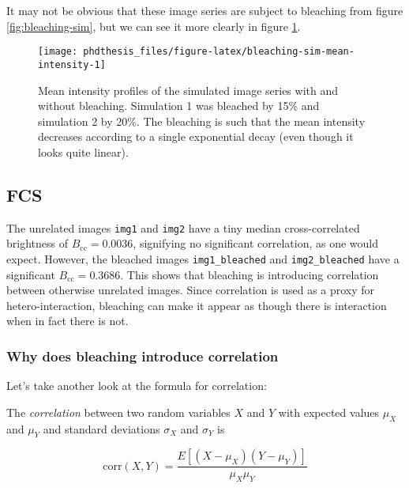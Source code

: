 \documentclass[12pt,]{book}
\theoremstyle{definition}
\theoremstyle{definition}
\theoremstyle{definition}
\theoremstyle{remark}
\let\BeginKnitrBlock\begin \let\EndKnitrBlock\end
\begin{document}
It may not be obvious that these image series are subject to bleaching
from figure \ref{fig:bleaching-sim}, but we can see it more clearly in
figure \ref{fig:bleaching-sim-mean-intensity}.







\begin{figure}

\texttt{[image: phdthesis\_files/figure-latex/bleaching-sim-mean-intensity-1]} \hfill{}

\caption{Mean intensity profiles of
the simulated image series with and without bleaching. Simulation 1 was
bleached by 15\% and simulation 2 by 20\%. The bleaching is such that
the mean intensity decreases according to a single exponential decay
(even though it looks quite linear).}\label{fig:bleaching-sim-mean-intensity}
\end{figure}

\subsection{FCS}\label{fcs}

The unrelated images \texttt{img1} and \texttt{img2} have a tiny median
cross-correlated brightness of \(B_\text{cc} = 0.0036\), signifying no
significant correlation, as one would expect. However, the bleached
images \texttt{img1\_bleached} and \texttt{img2\_bleached} have a
significant \(B_\text{cc} = 0.3686\). This shows that bleaching is
introducing correlation between otherwise unrelated images. Since
correlation is used as a proxy for hetero-interaction, bleaching can
make it appear as though there is interaction when in fact there is not.

\subsubsection{Why does bleaching introduce
correlation}\label{why-does-bleaching-introduce-correlation}

Let's take another look at the formula for correlation:

\BeginKnitrBlock{definition}[FCS]
\protect\hypertarget{def:unnamed-chunk-30}{}{\label{def:unnamed-chunk-30}
\iffalse (FCS) \fi{} }The \emph{correlation} between two random
variables \(X\) and \(Y\) with expected values \(\mu_X\) and \(\mu_Y\)
and standard deviations \(\sigma_X\) and \(\sigma_Y\) is

\begin{equation}
\text{corr}(X, Y) = \frac{E[(X - \mu_X)(Y - \mu_Y)]}{\mu_X \mu_Y}
\label{eq:FCSCorrelationDuplicate}
\end{equation}
\EndKnitrBlock{definition}
\end{document}
